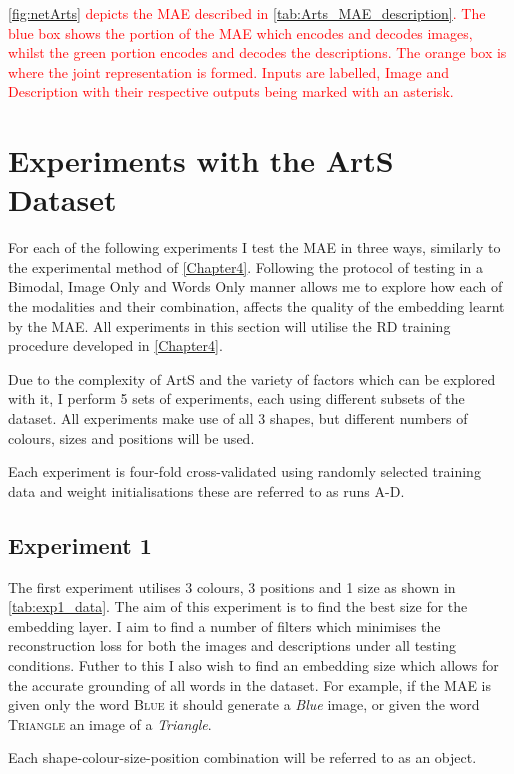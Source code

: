 \textcolor{red}{\autoref{fig:netArts} depicts the \ac{MAE} described in \autoref{tab:Arts_MAE_description}. The blue box shows the portion of the \ac{MAE} which encodes and decodes images, whilst the green portion encodes and decodes the descriptions. The orange box is where the joint representation is formed. Inputs are labelled, Image and Description with their respective outputs being marked with an asterisk.}
	


\section{Experiments with the ArtS Dataset}
For each of the following experiments I test the \ac{MAE} in three ways, similarly to the experimental method of \autoref{Chapter4}. Following the protocol of testing in a Bimodal, Image Only and Words Only manner allows me to explore how each of the modalities and their combination, affects the quality of the embedding learnt by the \ac{MAE}. All experiments in this section will utilise the RD training procedure developed in \autoref{Chapter4}.

Due to the complexity of ArtS and the variety of factors which can be explored with it, I perform 5 sets of experiments, each using different subsets of the dataset. All experiments make use of all 3 shapes, but different numbers of colours, sizes and positions will be used.

Each experiment is four-fold cross-validated using randomly selected training data and weight initialisations these are referred to as runs A-D.

\subsection{Experiment 1}
The first experiment utilises 3 colours, 3 positions and 1 size as shown in \autoref{tab:exp1_data}. The aim of this experiment is to find the best size for the embedding layer. I aim to find a number of filters which minimises the reconstruction loss for both the images and descriptions under all testing conditions. Futher to this I also wish to find an embedding size which allows for the accurate grounding of all words in the dataset. For example, if the \ac{MAE} is given only the word \textsc{Blue} it should generate a \textit{Blue} image, or given the word \textsc{Triangle} an image of a \textit{Triangle}. 

Each shape-colour-size-position combination will be referred to as an object.

